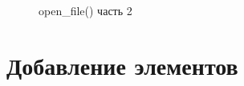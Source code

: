 \documentclass[12pt, a4paper]{article}
\begin{document}
\begin{figure}[H]
    \caption{open\_file() часть 2}
\end{figure}


\newpage
\section{Добавление элементов}













\end{document}
